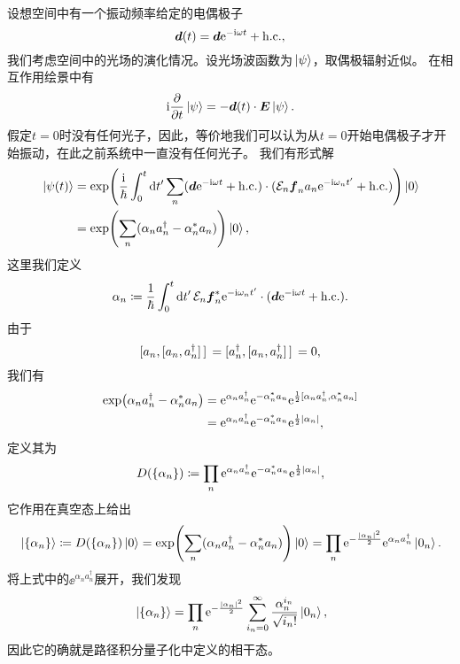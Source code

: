 设想空间中有一个振动频率给定的电偶极子
\begin{equation}
    \vb*{d}(t) = \vb*{d} \mathrm{e}^{- \mathrm{i} \omega t } + \text{h.c.},
\end{equation}
我们考虑空间中的光场的演化情况。设光场波函数为$\ket*{\psi}$，取偶极辐射近似。
在相互作用绘景中有
\begin{equation}
    \mathrm{i} \pdv{t} \ket*{\psi} = - \vb*{d}(t) \cdot \vb*{E} \ket*{\psi}.
\end{equation}
假定$t=0$时没有任何光子，因此，等价地我们可以认为从$t=0$开始电偶极子才开始振动，在此之前系统中一直没有任何光子。
我们有形式解
\[
    \begin{aligned}
        \ket*{\psi(t)} &= \exp(\frac{\mathrm{i}}{\hbar} \int_0^t \dd{t'} \sum_n (\vb*{d} \mathrm{e}^{- \mathrm{i} \omega t } + \text{h.c.}) \cdot (\mathcal{E}_n \vb*{f}_n a_n \mathrm{e}^{- \mathrm{i} \omega_n t'} + \text{h.c.}) ) \ket*{0} \\
        &= \exp(\sum_n (\alpha_n a_n^\dagger - \alpha_n^* a_n) ) \ket*{0},
    \end{aligned}
\]
这里我们定义
\begin{equation}
    \alpha_n \coloneqq \frac{1}{\hbar} \int_0^t \dd{t'} \mathcal{E}_n \vb*{f}_n^* \mathrm{e}^{-\mathrm{i} \omega_n t'} \cdot (\vb*{d} \mathrm{e}^{- \mathrm{i} \omega t} + \text{h.c.}).
\end{equation}
由于
\[
    \comm*{a_n}{\comm*{a_n}{a^\dagger_n}} = \comm*{a^\dagger_n}{\comm*{a_n}{a^\dagger_n}} = 0,
\]
我们有
\[
    \begin{aligned}
        \exp(\alpha_n a_n^\dagger - \alpha_n^* a_n) &= \ee^{\alpha_n a_n^\dagger} \ee^{- \alpha_n^* a_n} \ee^{\frac{1}{2} \comm*{\alpha_n a_n^\dagger}{\alpha_n^* a_n}} \\
        &= \ee^{\alpha_n a_n^\dagger} \ee^{- \alpha_n^* a_n} \ee^{\frac{1}{2} \abs{\alpha_n}},
    \end{aligned}
\]
定义其为
\begin{equation}
    D(\{\alpha_n\}) \coloneqq \prod_n \mathrm{e}^{\alpha_n a_n^\dagger} \mathrm{e}^{- \alpha_n^* a_n} \mathrm{e}^{\frac{1}{2} \abs{\alpha_n}},
\end{equation}
它作用在真空态上给出
\begin{equation}
    \ket*{\{\alpha_n\}} \coloneqq D(\{\alpha_n\}) \ket*{0} = \exp(\sum_n (\alpha_n a_n^\dagger - \alpha_n^* a_n) ) \ket*{0} = \prod_n \mathrm{e}^{- \frac{\abs{\alpha_n}^2}{2}} \mathrm{e}^{\alpha_n a^\dagger_n} \ket*{0_n}.
\end{equation}
将上式中的$\ee^{\alpha_n a^\dagger_n}$展开，我们发现
\begin{equation}
    \ket*{\{\alpha_n\}} = \prod_n \mathrm{e}^{- \frac{\abs{\alpha_n}^2}{2}} \sum_{i_n=0}^\infty \frac{\alpha_n^{i_n}}{\sqrt{i_n!}} \ket*{0_n},
\end{equation}
因此它的确就是路径积分量子化中定义的相干态。

